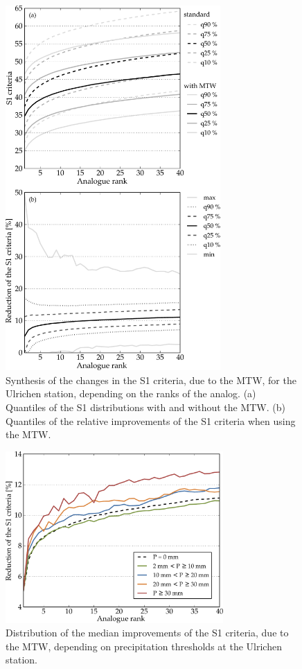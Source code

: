 \documentclass[hess, manuscript]{copernicus}
\begin{document}
\begin{figure}[htb]
	\begin{center}
		\includegraphics[width=8.2cm]{figures/changes_S1_value_and_gain.pdf}
	\end{center}
	\caption{Synthesis of the changes in the S1 criteria, due to the MTW, for the Ulrichen station, depending on the ranks of the analog. (a) Quantiles of the S1 distributions with and without the MTW. (b) Quantiles of the relative improvements of the S1 criteria when using the MTW.}
	\label{fig:changes_S1}
\end{figure}

\begin{figure}[htb]
	\begin{center}
		\includegraphics[width=8.3cm]{figures/changes_S1_precip_threshold.pdf}
	\end{center}
	\caption{Distribution of the median improvements of the S1 criteria, due to the MTW, depending on precipitation thresholds at the Ulrichen station.}
	\label{fig:changes_S1_precip_threshold}
\end{figure}
\end{document}
